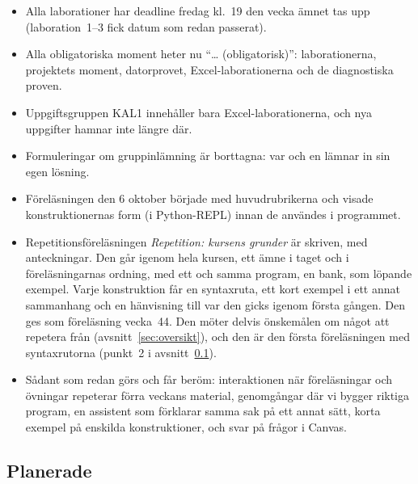 \documentclass[a4paper]{article}
\begin{document}
\begin{refsection}
\begin{itemize}
\item Alla laborationer har deadline fredag kl.~19 den vecka ämnet tas
  upp (laboration~1--3 fick datum som redan passerat).
\item Alla obligatoriska moment heter nu \enquote{\dots{}
  (obligatorisk)}: laborationerna, projektets moment, datorprovet,
  Excel-laborationerna och de diagnostiska proven.
\item Uppgiftsgruppen KAL1 innehåller bara Excel-laborationerna, och nya
  uppgifter hamnar inte längre där.
\item Formuleringar om gruppinlämning är borttagna: var och en lämnar in
  sin egen lösning.
\item Föreläsningen den 6 oktober började med huvudrubrikerna och visade
  konstruktionernas form (i Python-REPL) innan de användes i programmet.
\item Repetitionsföreläsningen \emph{Repetition: kursens grunder} är
  skriven, med anteckningar. Den går igenom hela kursen, ett ämne i
  taget och i föreläsningarnas ordning, med ett och samma program, en
  bank, som löpande exempel. Varje konstruktion får en syntaxruta, ett
  kort exempel i ett annat sammanhang och en hänvisning till var den
  gicks igenom första gången. Den ges som föreläsning vecka~44. Den
  möter delvis önskemålen om något att repetera från
  (avsnitt~\ref{sec:oversikt}), och den är den första föreläsningen med
  syntaxrutorna (punkt~2 i avsnitt~\ref{sec:planerat}).
\item Sådant som redan görs och får beröm: interaktionen när
  föreläsningar och övningar repeterar förra veckans material, genomgångar där vi bygger riktiga program, en assistent som
  förklarar samma sak på ett annat sätt, korta exempel på enskilda
  konstruktioner, och svar på frågor i Canvas.
\end{itemize}

\subsection{Planerade}\label{sec:planerat}


\end{refsection}
\end{document}
